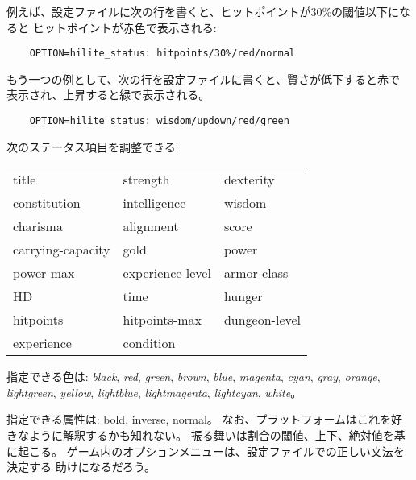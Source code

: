 例えば、設定ファイルに次の行を書くと、ヒットポイントが30\%の閾値以下になると
ヒットポイントが赤色で表示される:
\begin{verbatim}
    OPTION=hilite_status: hitpoints/30%/red/normal
\end{verbatim}
もう一つの例として、次の行を設定ファイルに書くと、賢さが低下すると赤で
表示され、上昇すると緑で表示される。
\begin{verbatim}
    OPTION=hilite_status: wisdom/updown/red/green
\end{verbatim}
次のステータス項目を調整できる:
\begin{center}
\begin{tabular}{lll}
title & strength & dexterity\\
constitution & intelligence & wisdom\\
charisma & alignment & score\\
carrying-capacity & gold & power\\
power-max & experience-level & armor-class\\
HD & time & hunger\\
hitpoints & hitpoints-max & dungeon-level\\
experience & condition\\
\end{tabular}
\end{center}

指定できる色は:
{\it black}, {\it red}, {\it green}, {\it brown},
{\it blue}, {\it magenta}, {\it cyan}, {\it gray}, {\it orange},
{\it lightgreen}, {\it yellow}, {\it lightblue}, {\it lightmagenta},
{\it lightcyan}, {\it white}。

指定できる属性は:
bold, inverse, normal。
なお、プラットフォームはこれを好きなように解釈するかも知れない。
振る舞いは割合の閾値、上下、絶対値を基に起こる。
ゲーム内のオプションメニューは、設定ファイルでの正しい文法を決定する
助けになるだろう。

